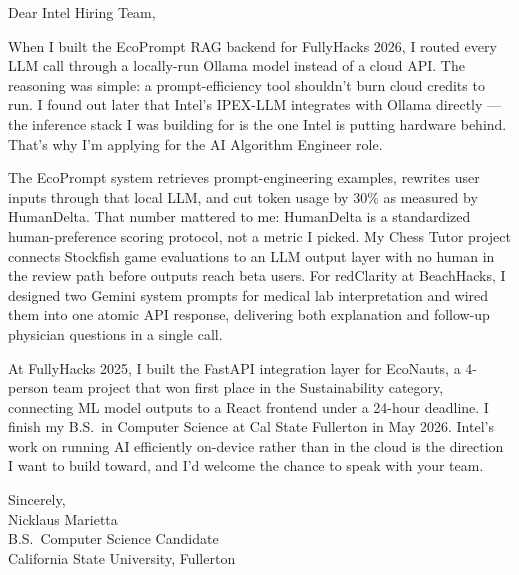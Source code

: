 \documentclass[11pt,a4paper,roman]{moderncv}
\begin{document}
\date{\today}
\opening{Dear Intel Hiring Team,}
\makelettertitle

\begin{justify}
When I built the EcoPrompt RAG backend for FullyHacks 2026, I routed every LLM call through
a locally-run Ollama model instead of a cloud API. The reasoning was simple: a prompt-efficiency
tool shouldn't burn cloud credits to run. I found out later that Intel's IPEX-LLM integrates
with Ollama directly --- the inference stack I was building for is the one Intel is putting
hardware behind. That's why I'm applying for the AI Algorithm Engineer role.

\par

The EcoPrompt system retrieves prompt-engineering examples, rewrites user inputs through that
local LLM, and cut token usage by 30\% as measured by HumanDelta. That number mattered to
me: HumanDelta is a standardized human-preference scoring protocol, not a metric I picked. My
Chess Tutor project connects Stockfish game evaluations to an LLM output layer with no human
in the review path before outputs reach beta users. For redClarity at BeachHacks, I designed
two Gemini system prompts for medical lab interpretation and wired them into one atomic API
response, delivering both explanation and follow-up physician questions in a single call.

\par

At FullyHacks 2025, I built the FastAPI integration layer for EcoNauts, a 4-person team
project that won first place in the Sustainability category, connecting ML model outputs to a
React frontend under a 24-hour deadline. I finish my B.S.\ in Computer Science at Cal State
Fullerton in May 2026. Intel's work on running AI efficiently on-device rather than in the
cloud is the direction I want to build toward, and I'd welcome the chance to speak with
your team.
\end{justify}

\vspace{0.3cm}
{Sincerely,\\
Nicklaus Marietta\\
B.S.\ Computer Science Candidate\\
California State University, Fullerton}
\end{document}
